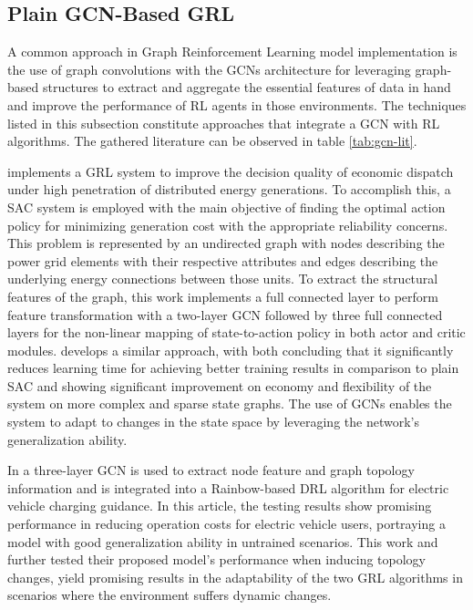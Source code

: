 \subsection{Plain GCN-Based GRL} \label{sec:gcn-lit}

A common approach in Graph Reinforcement Learning model implementation is the use of graph convolutions with the \acp{GCN} architecture for leveraging graph-based structures to extract and aggregate the essential features of data in hand and improve the performance of \ac{RL} agents in those environments. The techniques listed in this subsection constitute approaches that integrate a \ac{GCN} with \ac{RL} algorithms. The gathered literature can be observed in table \ref{tab:gcn-lit}. \par
\cite{liNovelGraphReinforcement2022} implements a \ac{GRL} system to improve the decision quality of economic dispatch under high penetration of distributed energy generations. To accomplish this, a \ac{SAC} system is employed with the main objective of finding the optimal action policy for minimizing generation cost with the appropriate reliability concerns. This problem is represented by an undirected graph with nodes describing the power grid elements with their respective attributes and edges describing the underlying energy connections between those units. To extract the structural features of the graph, this work implements a full connected layer to perform feature transformation with a two-layer \ac{GCN} followed by three full connected layers for the non-linear mapping of state-to-action policy in both actor and critic modules. \cite{chenScalableGraphReinforcement2023} develops a similar approach, with both concluding that it significantly reduces learning time for achieving better training results in comparison to plain \ac{SAC} and showing significant improvement on economy and flexibility of the system on more complex and sparse state graphs. The use of \acp{GCN} enables the system to adapt to changes in the state space by leveraging the network's generalization ability.\par
In \cite{xingGraphReinforcementLearningBased2023} a three-layer \ac{GCN} is used to extract node feature and graph topology information and is integrated into a Rainbow-based \cite{hesselRainbowCombiningImprovements2018} \ac{DRL} algorithm for electric vehicle charging guidance. In this article, the testing results show promising performance in reducing operation costs for electric vehicle users, portraying a model with good generalization ability in untrained scenarios. This work and  \cite{chenScalableGraphReinforcement2023} further tested their proposed model's performance when inducing topology changes, yield promising results in the adaptability of the two \ac{GRL} algorithms in scenarios where the environment suffers dynamic changes.\par

